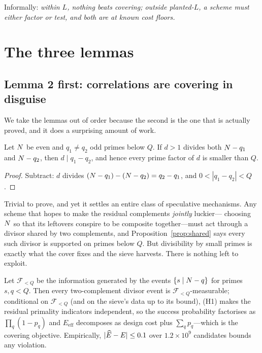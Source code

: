 Informally: \emph{within $L$, nothing beats covering; outside planted-$L$, a
scheme must either factor or test, and both are at known cost floors.}

\section{The three lemmas}

\subsection{Lemma 2 first: correlations are covering in disguise}

We take the lemmas out of order because the second is the one that is actually
proved, and it does a surprising amount of work.

\begin{proposition}\label{prop:shared}
Let $N$ be even and $q_1\ne q_2$ odd primes below $Q$. If $d>1$ divides both
$N-q_1$ and $N-q_2$, then $d\mid q_1-q_2$, and hence every prime factor of $d$
is smaller than $Q$.
\end{proposition}
\begin{proof}
Subtract: $d$ divides $(N-q_1)-(N-q_2)=q_2-q_1$, and $0<|q_1-q_2|<Q$.
\end{proof}

Trivial to prove, and yet it settles an entire class of speculative mechanisms.
Any scheme that hopes to make the residual complements \emph{jointly} luckier---%
choosing $N$ so that its leftovers conspire to be composite together---must act
through a divisor shared by two complements, and Proposition~\ref{prop:shared}
says every such divisor is supported on primes below $Q$. But divisibility by
small primes is exactly what the cover fixes and the sieve harvests. There is
nothing left to exploit.

\begin{lemma}\label{lem:correlation}
Let $\mathcal F_{<Q}$ be the information generated by the events
$\{s\mid N-q\}$ for primes $s,q<Q$. Then every two-complement divisor event is
$\mathcal F_{<Q}$-measurable; conditional on $\mathcal F_{<Q}$ (and on the
sieve's data up to its bound), (H1) makes the residual primality indicators
independent, so the success probability factorises as $\prod_q(1-p_q)$ and
$E_{\text{eff}}$ decomposes as design cost plus $\sum_q p_q$---which is the
covering objective. Empirically, $|\widehat{E}-E|\le0.1$ over $1.2\times10^{9}$
candidates bounds any violation.
\end{lemma}

